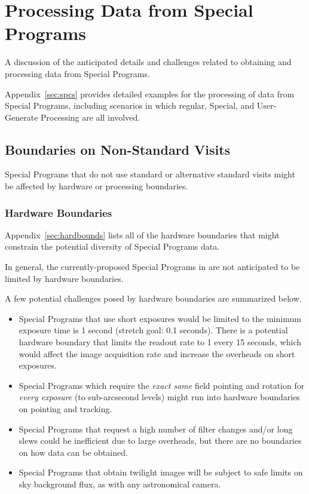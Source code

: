 \section{Processing Data from Special Programs}\label{sec:proc}

A discussion of the anticipated details and challenges related to 
obtaining and processing data from Special Programs.

Appendix~\ref{sec:spcs} provides detailed examples for the processing
of data from Special Programs, including scenarios in which regular,
Special, and User-Generate Processing are all involved.

\subsection{Boundaries on Non-Standard Visits} \label{ssec:proc_bounds}

Special Programs that do not use standard or alternative standard visits
might be affected by hardware or processing boundaries.

\subsubsection{Hardware Boundaries}\label{ssec:proc_bounds_hardware}

Appendix~\ref{sec:hardbounds} lists all of the hardware boundaries that 
might constrain the potential diversity of Special Programs data.

In general, the currently-proposed Special Programs in 
are not anticipated to be limited by hardware boundaries.

A few potential challenges posed by hardware
boundaries are summarized below.

\begin{itemize}

\item Special Programs that use short exposures would be limited to the
minimum exposure time is 1 second (stretch goal: 0.1 seconds).
There is a potential hardware boundary that limits the readout rate to 1 
every 15 seconds, which would affect the image acquisition rate and 
increase the overheads on short exposures.

\item Special Programs which require the \emph{exact same} field pointing and 
rotation for \emph{every exposure} (to sub-arcsecond levels) might run 
into hardware boundaries on pointing and tracking.

\item Special Programs that request a high number of filter changes and/or long 
slews could be inefficient due to large overheads, but there are no
boundaries on how data can be obtained.

\item Special Programs that obtain twilight images will be subject to safe
limits on sky background flux, as with any astronomical camera.

\end{itemize}

